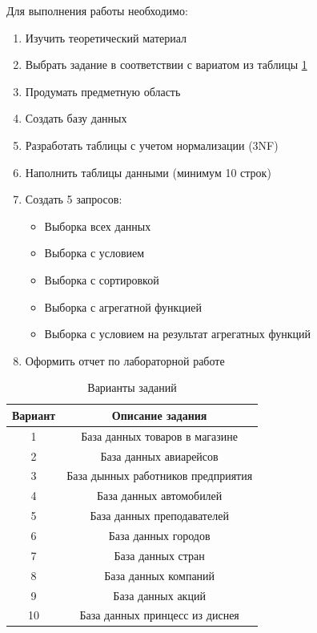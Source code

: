 \documentclass[a4paper]{article}
\begin{document}
Для выполнения работы необходимо:
\begin{enumerate}
  \item Изучить теоретический материал
  \item Выбрать задание в соответствии с вариатом из таблицы \ref{tab:tasks}
  \item Продумать предметную область
  \item Создать базу данных
  \item Разработать таблицы с учетом нормализации (3NF)
  \item Наполнить таблицы данными (минимум 10 строк)
   \item Создать 5 запросов:
    \begin{itemize}
      \item Выборка всех данных
      \item Выборка с условием
      \item Выборка с сортировкой
      \item Выборка с агрегатной функцией
      \item Выборка с условием на результат агрегатных функций
    \end{itemize}
  \item Оформить отчет по лабораторной работе
\end{enumerate}

\begin{table}[h]
      \caption{Варианты заданий}
      \begin{center}\label{tab:tasks}
      \begin{tabular}{|c|c|}
        \hline
        Вариант & Описание задания \\
        \hline
        1 & База данных товаров в магазине\\
        2 & База данных авиарейсов\\
        3 & База дынных работников предприятия\\
        4 & База данных автомобилей\\
        5 & База данных преподавателей\\
        6 & База данных городов\\
        7 & База данных стран\\
        8 & База данных компаний\\
        9 & База данных акций\\
        10 & База данных принцесс из диснея \\
        \hline
      \end{tabular}
    \end{center}
\end{table}
\end{document}
